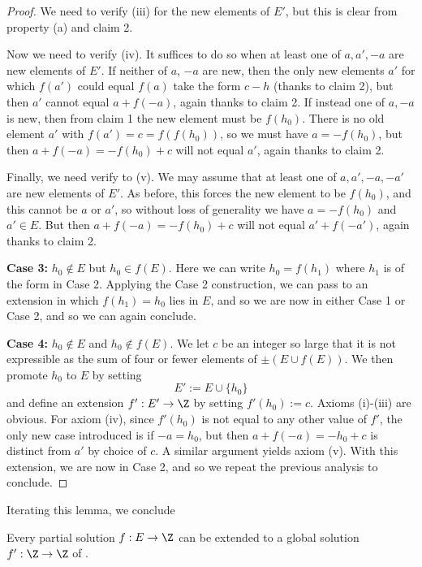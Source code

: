 \begin{proof}
We need to verify (iii) for the new elements of $E'$, but this is clear from property (a) and claim 2.

Now we need to verify (iv).  It suffices to do so when at least one of $a,a',-a$ are new elements of $E'$.  If neither of $a$, $-a$ are new, then the only new elements $a'$ for which $f(a')$ could equal $f(a)$ take the form $c-h$ (thanks to claim 2), but then $a'$ cannot equal $a+f(-a)$, again thanks to claim 2.  If instead one of $a, -a$ is new, then from claim 1 the new element must be $f(h_0)$.  There is no old element $a'$ with $f(a') = c = f(f(h_0))$, so we must have $a = -f(h_0)$, but then $a + f(-a) = -f(h_0)+c$ will not equal $a'$, again thanks to claim 2.

Finally, we need verify to (v).  We may assume that at least one of $a,a',-a,-a'$ are new elements of $E'$.  As before, this forces the new element to be $f(h_0)$, and this cannot be $a$ or $a'$, so without loss of generality we have $a = -f(h_0)$ and $a' \in E$.  But then $a + f(-a) = -f(h_0)+c$ will not equal $a' + f(-a')$, again thanks to claim 2.

{\bf Case 3:} $h_0 \not \in E$ but $h_0 \in f(E)$.  Here we can write $h_0 = f(h_1)$ where $h_1$ is of the form in Case 2.  Applying the Case 2 construction, we can pass to an extension in which $f(h_1) = h_0$ lies in $E$, and so we are now in either Case 1 or Case 2, and so we can again conclude.

{\bf Case 4:} $h_0 \not \in E$ and $h_0 \not \in f(E)$.  We let $c$ be an integer so large that it is not expressible as the sum of four or fewer elements of $\pm (E \cup f(E))$.  We then promote $h_0$ to $E$ by setting
$$E' := E \cup \{h_0\}$$
and define an extension $f': E' \to \Z$ by setting $f'(h_0) := c$.  Axioms (i)-(iii) are obvious.  For axiom (iv), since $f'(h_0)$ is not equal to any other value of $f'$, the only new case introduced is if $-a = h_0$, but then $a+f(-a) = -h_0+c$ is distinct from $a'$ by choice of $c$.  A similar argument yields axiom (v).  With this extension, we are now in Case 2, and so we repeat the previous analysis to conclude.
\end{proof}

Iterating this lemma, we conclude

\begin{corollary}\label{dupont-iter} Every partial solution $f: E \to \Z$ can be extended to a global solution $f': \Z \to\Z$ of .
\end{corollary}

